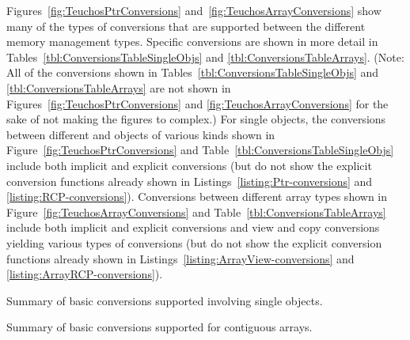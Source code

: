 \documentclass[pdf,ps2pdf,11pt]{SANDreport}
\begin{document}
Figures~\ref{fig:TeuchosPtrConversions}
and~\ref{fig:TeuchosArrayConversions} show many of the types of
conversions that are supported between the different memory management
types.  Specific conversions are shown in more detail in
Tables~\ref{tbl:ConversionsTableSingleObjs} and
{}\ref{tbl:ConversionsTableArrays}.  (Note: All of the conversions
shown in Tables~\ref{tbl:ConversionsTableSingleObjs} and
{}\ref{tbl:ConversionsTableArrays} are not shown in
Figures~\ref{fig:TeuchosPtrConversions} and
{}\ref{fig:TeuchosArrayConversions} for the sake of not making the
figures to complex.)  For single objects, the conversions between
different {} and {} objects of various kinds shown
in Figure~\ref{fig:TeuchosPtrConversions} and
Table~\ref{tbl:ConversionsTableSingleObjs} include both implicit and
explicit conversions (but do not show the explicit conversion
functions already shown in Listings~\ref{listing:Ptr-conversions} and
{}\ref{listing:RCP-conversions}).  Conversions between different array
types shown in Figure~\ref{fig:TeuchosArrayConversions} and
Table~\ref{tbl:ConversionsTableArrays} include both implicit and
explicit conversions and view and copy conversions yielding various
types of conversions (but do not show the explicit conversion
functions already shown in
Listings~\ref{listing:ArrayView-conversions} and
{}\ref{listing:ArrayRCP-conversions}).


\begin{table}
\begin{center}

\caption{\label{tbl:ConversionsTableSingleObjs}
Summary of basic conversions supported involving single objects.}
\end{center}
\end{table}


\begin{table}
\begin{center}

\caption{\label{tbl:ConversionsTableArrays}
Summary of basic conversions supported for contiguous arrays.}
\end{center}
\end{table}
\end{document}

